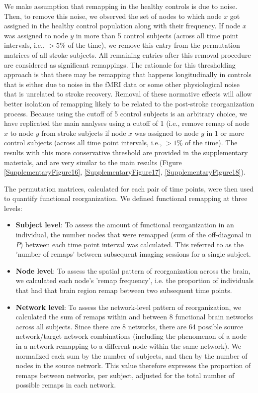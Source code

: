 \documentclass[phd,tocprelim]{cornell}
\begin{document}
	We make assumption that remapping in the healthy controls is due to noise. Then, to remove this noise, we observed the set of nodes to which node $x$ got assigned in the healthy control population along with their frequency. If node $x$ was assigned to node $y$ in more than 5 control subjects (across all time point intervals, i.e., $> 5 \%$ of the time), we remove this entry from the permutation matrices of all stroke subjects. All remaining entries after this removal procedure are considered as significant remappings. The rationale for this thresholding approach is that there may be remapping that happens longitudinally in controls that is either due to noise in the fMRI data or some other physiological noise that is unrelated to stroke recovery. Removal of these normative effects will allow better isolation of remapping likely to be related to the post-stroke reorganization process. Because using the cutoff of 5 control subjects is an arbitrary choice, we have replicated the main analyses using a cutoff of 1 (i.e., remove remap of node $x$ to node $y$ from stroke subjects if node $x$ was assigned to node $y$ in 1 or more control subjects (across all time point intervals, i.e., $> 1 \%$ of the time). The results with this more conservative threshold are provided in the supplementary materials, and are very similar to the main results (Figure \ref{SupplementaryFigure16}, \ref{SupplementaryFigure17}, \ref{SupplementaryFigure18}).

	The permutation matrices, calculated for each pair of time points, were then used to quantify functional reorganization. We defined functional remapping at three levels:
	
	\begin{itemize}
	 \item \textbf{Subject level}: To assess the amount of functional reorganization in an individual, the number nodes that were remapped (sum of the off-diagonal in $P$) between each time point interval was calculated. This referred to as the 'number of remaps' between subsequent imaging sessions for a single subject.
	 
	 \item \textbf{Node level}: To assess the spatial pattern of reorganization across the brain, we calculated each node's 'remap frequency', i.e. the proportion of individuals that had that brain region remap between two subsequent time points.
	 
	 \item \textbf{Network level}: To assess the network-level pattern of reorganization, we calculated the sum of remaps within and between 8 functional brain networks across all subjects. Since there are 8 networks, there are 64 possible source network/target network combinations (including the phenomenon of a node in a network remapping to a different node within the same network). We normalized each sum by the number of subjects, and then by the number of nodes in the source network. This value therefore expresses the proportion of remaps between networks, per subject, adjusted for the total number of possible remaps in each network. 
	\end{itemize}
\end{document}
